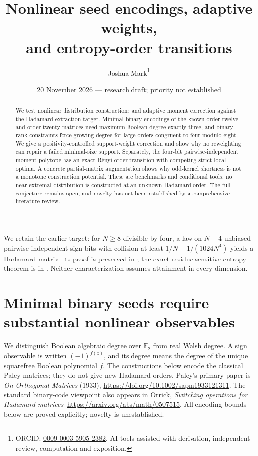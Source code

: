 \documentclass[11pt]{article}
\title{Nonlinear seed encodings, adaptive weights,\\and entropy-order transitions}
\author{Joshua Mark\thanks{ORCID: \href{https://orcid.org/0009-0003-5905-2382}{0009-0003-5905-2382}. AI tools assisted with derivation, independent review, computation and exposition.}}
\date{20 November 2026 --- research draft; priority not established}
\begin{document}
\maketitle

\begin{abstract}
We test nonlinear distribution constructions and adaptive moment
correction against the Hadamard extraction target. Minimal binary
encodings of the known order-twelve and order-twenty matrices need
maximum Boolean degree exactly three, and binary-rank constraints
force growing degree for large orders congruent to four modulo eight.
We give a positivity-controlled support-weight correction and show
why no reweighting can repair a failed minimal-size support.
Separately, the four-bit pairwise-independent moment polytope has an
exact R\'enyi-order transition with competing strict local optima.
A concrete partial-matrix augmentation shows why odd-kernel shortness
is not a monotone construction potential. These are benchmarks and
conditional tools; no near-extremal distribution is constructed at
an unknown Hadamard order. The full conjecture remains open, and
novelty has not been established by a comprehensive literature review.
\end{abstract}
We retain the earlier target: for $N\ge8$ divisible by four, a law on
$N-4$ unbiased pairwise-independent sign bits with collision at least
$1/N-1/(1024N^4)$ yields a Hadamard matrix. Its proof is preserved in
; the exact residue-sensitive
entropy theorem is in .
Neither characterization assumes attainment in every dimension.
\section{Minimal binary seeds require substantial nonlinear observables}
\label{sec:nonlinear-seeds}
We distinguish Boolean algebraic degree over $\mathbb F_2$ from real
Walsh degree. A sign observable is written $(-1)^{f(z)}$, and its degree
means the degree of the unique squarefree Boolean polynomial $f$.
The constructions below encode the classical Paley matrices; they do
not give new Hadamard orders. Paley's primary paper is
\emph{On Orthogonal Matrices} (1933),
\url{https://doi.org/10.1002/sapm1933121311}. The standard binary-code
viewpoint also appears in Orrick, \emph{Switching operations for Hadamard
matrices}, \url{https://arxiv.org/abs/math/0507515}.
All encoding bounds below are proved explicitly; novelty is unestablished.
\end{document}
